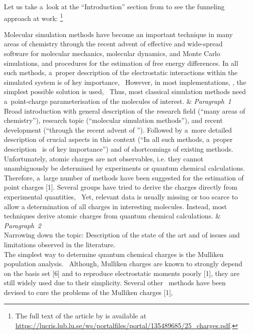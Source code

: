 \documentclass[11pt, a4paper, oneside]{article}
\newlength{\smalllinespacing}
\theoremstyle{Plain}
\theoremstyle{Definition}
\theoremstyle{Remark}
\begin{document}
Let us take a~look at the ``Introduction'' section from \citet{sigfridsson} to see the funneling approach at work:%
\footnote{The full text of the article by \citet{sigfridsson} is available at \url{https://lucris.lub.lu.se/ws/portalfiles/portal/135489685/25_charges.pdf}.}
\begin{longtblr}{}
	Molecular simulation methods have become an important technique in many areas of chemistry through the recent advent of effective and wide-spread software for molecular mechanics, molecular dynamics, and Monte Carlo simulations, and procedures for the estimation of free energy differences. In all such methods, a~proper description of the electrostatic interactions within the simulated system is of key importance, \textellipsis\ However, in most implementations, \textellipsis, the simplest possible solution is used, \textellipsis\ Thus, most classical simulation methods need a~point-charge parameterisation of the molecules of interest.
	&
	{%
		\textit{Paragraph~1} \\
		\textmd{Broad introduction with general description of the research field (``many areas of
		chemistry''), research topic (``molecular simulation methods''), and recent development (``through the recent advent of \textellipsis''). Followed by a~more detailed description of crucial aspects in this context (``In all such methods, a~proper description \textellipsis\ is of key importance'') and of shortcomings of existing methods.}
	}
	\\
	\hspace{\smalllinespacing}Unfortunately, atomic charges are not observables, i.e. they cannot unambiguously be determined by experiments or quantum chemical calculations. Therefore, a~large number of methods have been suggested for the estimation of point charges [1]. Several groups have tried to derive the charges directly from experimental quantities, \textellipsis\ Yet, relevant data is usually missing or too scarce to allow a determination of all charges in interesting molecules. Instead, most techniques derive atomic charges from quantum chemical calculations.
	&
	{%
		\textit{Paragraph~2} \\
		Narrowing down the topic: Description of the state of the art and of issues and limitations observed in the literature.%
	}
	\\
	{%
		\hspace{\smalllinespacing}The simplest way to determine quantum chemical charges is the Mulliken population
		analysis. \textellipsis\ Although, Mulliken charges are known to strongly depend on the basis set [6] and to reproduce electrostatic moments poorly [1], they are still widely used due to their simplicity. Several other \textellipsis\ methods have been devised to cure the problems of the Mulliken charges [1], \textellipsis
}
\end{longtblr}
\end{document}

